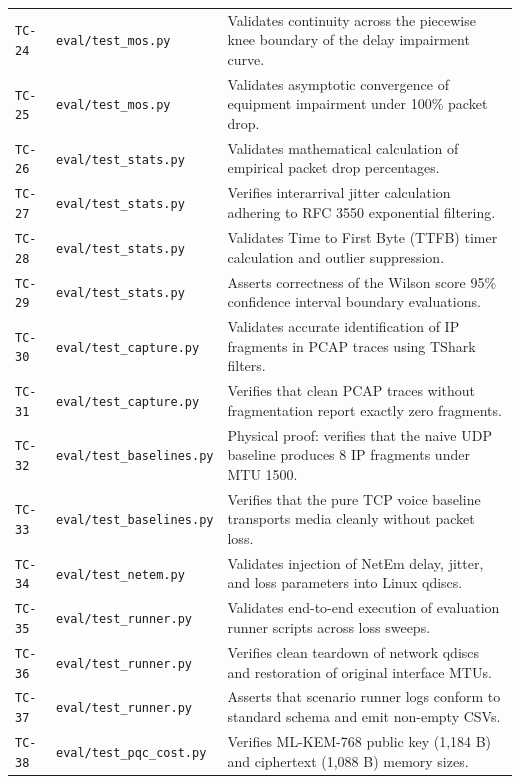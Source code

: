 \begin{table}[htbp]
\begin{tabularx}{\textwidth}{l l p{8.5cm}}
        \texttt{TC-24} & \texttt{eval/test\_mos.py} & Validates continuity across the piecewise knee boundary of the delay impairment curve. \\
        \texttt{TC-25} & \texttt{eval/test\_mos.py} & Validates asymptotic convergence of equipment impairment under 100\% packet drop. \\
        \texttt{TC-26} & \texttt{eval/test\_stats.py} & Validates mathematical calculation of empirical packet drop percentages. \\
        \texttt{TC-27} & \texttt{eval/test\_stats.py} & Verifies interarrival jitter calculation adhering to RFC 3550 exponential filtering. \\
        \texttt{TC-28} & \texttt{eval/test\_stats.py} & Validates Time to First Byte (TTFB) timer calculation and outlier suppression. \\
        \texttt{TC-29} & \texttt{eval/test\_stats.py} & Asserts correctness of the Wilson score 95\% confidence interval boundary evaluations. \\
        \texttt{TC-30} & \texttt{eval/test\_capture.py} & Validates accurate identification of IP fragments in PCAP traces using TShark filters. \\
        \texttt{TC-31} & \texttt{eval/test\_capture.py} & Verifies that clean PCAP traces without fragmentation report exactly zero fragments. \\
        \texttt{TC-32} & \texttt{eval/test\_baselines.py} & Physical proof: verifies that the naive UDP baseline produces 8 IP fragments under MTU 1500. \\
        \texttt{TC-33} & \texttt{eval/test\_baselines.py} & Verifies that the pure TCP voice baseline transports media cleanly without packet loss. \\
        \texttt{TC-34} & \texttt{eval/test\_netem.py} & Validates injection of NetEm delay, jitter, and loss parameters into Linux qdiscs. \\
        \texttt{TC-35} & \texttt{eval/test\_runner.py} & Validates end-to-end execution of evaluation runner scripts across loss sweeps. \\
        \texttt{TC-36} & \texttt{eval/test\_runner.py} & Verifies clean teardown of network qdiscs and restoration of original interface MTUs. \\
        \texttt{TC-37} & \texttt{eval/test\_runner.py} & Asserts that scenario runner logs conform to standard schema and emit non-empty CSVs. \\
        \texttt{TC-38} & \texttt{eval/test\_pqc\_cost.py} & Verifies ML-KEM-768 public key (1,184 B) and ciphertext (1,088 B) memory sizes. \\

\end{tabularx}
\end{table}
